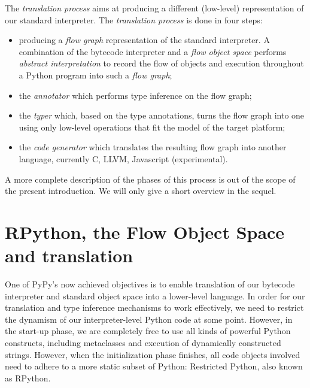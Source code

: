 \documentclass[a4paper,11pt,english]{article}
\begin{document}
The \emph{translation process} aims at producing a different (low-level)
representation of our standard interpreter.  The \emph{translation process} 
is done in four steps:
\begin{itemize}
\item {} 
producing a \emph{flow graph} representation of the standard interpreter. 
A combination of the bytecode interpreter and a \emph{flow object space}
performs \emph{abstract interpretation} to record the flow of objects
and execution throughout a Python program into such a \emph{flow graph};

\item {} 
the \emph{annotator} which performs type inference on the flow graph;

\item {} 
the \emph{typer} which, based on the type annotations, turns the flow graph
into one using only low-level operations that fit the model of the
target platform;

\item {} 
the \emph{code generator} which translates the resulting flow graph into
another language, currently C, LLVM, Javascript (experimental).

\end{itemize}

A more complete description of the phases of this process is out of the scope
of the present introduction.  We will only give a short overview in the sequel.
\hypertarget{initialization-time}{}\hypertarget{translation-process-in-more-details}{}


\hypertarget{rpython-the-flow-object-space-and-translation}{}
\section{RPython, the Flow Object Space and translation}

One of PyPy's now achieved objectives is to enable translation of our
bytecode interpreter and standard object space into a lower-level language.
In order for our translation and type inference mechanisms to work
effectively, we need to restrict the dynamism of our interpreter-level
Python code at some point.  However, in the start-up phase, we are
completely free to use all kinds of powerful Python constructs, including
metaclasses and execution of dynamically constructed strings.  However,
when the initialization phase finishes, all code objects involved need to
adhere to a more static subset of Python:
Restricted Python, also known as RPython.
\end{document}

